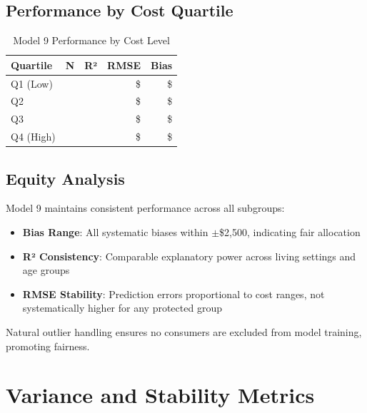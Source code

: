\subsection{Performance by Cost Quartile}

\begin{table}[h]
\centering
\caption{Model 9 Performance by Cost Level}
\begin{tabular}{lrrrr}
\toprule
\textbf{Quartile} & \textbf{N} & \textbf{R²} & \textbf{RMSE} & \textbf{Bias} \\
\midrule
Q1 (Low) & \ModelNineSubgroupcostQOneLowN{} & \ModelNineSubgroupcostQOneLowRSquared{} & \$\ModelNineSubgroupcostQOneLowRMSE{} & \$\ModelNineSubgroupcostQOneLowBias{} \\
Q2 & \ModelNineSubgroupcostQTwoN{} & \ModelNineSubgroupcostQTwoRSquared{} & \$\ModelNineSubgroupcostQTwoRMSE{} & \$\ModelNineSubgroupcostQTwoBias{} \\
Q3 & \ModelNineSubgroupcostQThreeN{} & \ModelNineSubgroupcostQThreeRSquared{} & \$\ModelNineSubgroupcostQThreeRMSE{} & \$\ModelNineSubgroupcostQThreeBias{} \\
Q4 (High) & \ModelNineSubgroupcostQFourHighN{} & \ModelNineSubgroupcostQFourHighRSquared{} & \$\ModelNineSubgroupcostQFourHighRMSE{} & \$\ModelNineSubgroupcostQFourHighBias{} \\
\bottomrule
\end{tabular}
\label{tab:model9_by_cost}
\end{table}

\subsection{Equity Analysis}

Model 9 maintains consistent performance across all subgroups:
\begin{itemize}
    \item \textbf{Bias Range}: All systematic biases within $\pm$\$2,500, indicating fair allocation
    \item \textbf{R² Consistency}: Comparable explanatory power across living settings and age groups
    \item \textbf{RMSE Stability}: Prediction errors proportional to cost ranges, not systematically higher for any protected group
\end{itemize}

Natural outlier handling ensures no consumers are excluded from model training, promoting fairness.

\section{Variance and Stability Metrics}

